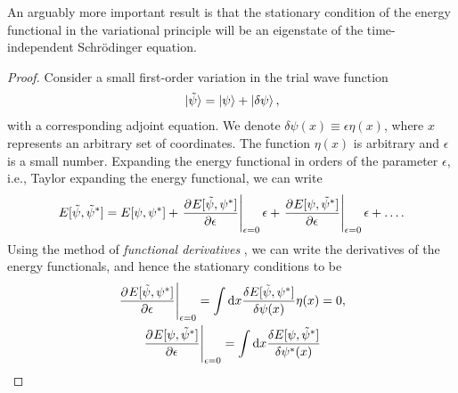         An arguably more important result is that the stationary condition of
        the energy functional in the variational principle will be an eigenstate
        of the time-independent Schrödinger equation.
        \begin{proof}
            Consider a small first-order variation in the trial wave function
            \begin{align}
                \ket*{\tilde{\psi}} = \ket{\psi} + \ket{\delta\psi},
                \label{eq:wave-variation}
            \end{align}
            with a corresponding adjoint equation.
            We denote $\delta\psi(x) \equiv \epsilon\eta(x)$, where $x$ represents an
            arbitrary set of coordinates.
            The function $\eta(x)$ is arbitrary and $\epsilon$ is a small
            number.
            Expanding the energy functional in orders of the parameter
            $\epsilon$, i.e., Taylor expanding the energy functional, we can
            write
            \begin{align}
                E[\tilde{\psi}, \tilde{\psi}^{*}]
                = E[\psi, \psi^{*}]
                + \left.
                \dpd{E[\tilde{\psi}, \psi^{*}]}{\epsilon}
                \right\rvert_{\epsilon = 0}
                \epsilon
                + \left.
                \dpd{E[\psi, \tilde{\psi}^{*}]}{\epsilon}
                \right\rvert_{\epsilon = 0}
                \epsilon
                + \dots.
            \end{align}
            Using the method of \emph{functional derivatives}
            \cite{wiki:functional-derivative, kvaal2017notes}, we can write
            the derivatives of the energy functionals, and hence the stationary
            conditions to be
            \begin{gather}
                \left.
                \dpd{E[\tilde{\psi}, \psi^{*}]}{\epsilon}
                \right\rvert_{\epsilon = 0}
                =
                \int\dd x \frac{
                    \delta E[\tilde{\psi}, \psi^{*}]
                }{
                    \delta \psi(x)
                }
                \eta(x)
                = 0,
                \\
                \left.
                \dpd{E[\psi, \tilde{\psi}^{*}]}{\epsilon}
                \right\rvert_{\epsilon = 0}
                =
                \int\dd x \frac{
                    \delta E[\psi, \tilde{\psi}^{*}]
                }{
                    \delta
                    \psi^{*}(x)
}
\end{gather}
\end{proof}
